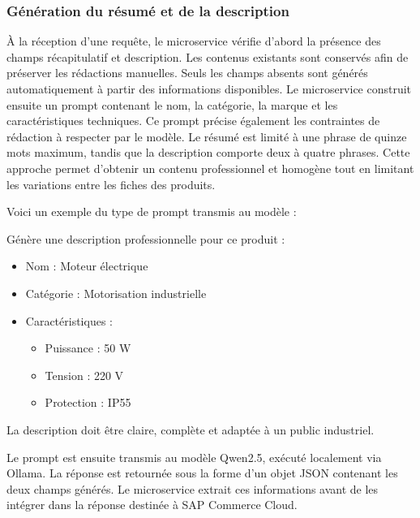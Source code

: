 \subsubsection{Génération du résumé et de la description}

À la réception d'une requête, le microservice vérifie d'abord la présence des champs récapitulatif et description. Les contenus existants sont conservés afin de préserver les rédactions manuelles. Seuls les champs absents sont générés automatiquement à partir des informations disponibles. Le microservice construit ensuite un prompt contenant le nom, la catégorie, la marque et les caractéristiques techniques. 
\newpage
Ce prompt précise également les contraintes de rédaction à respecter par le modèle. Le résumé est limité à une phrase de quinze mots maximum, tandis que la description comporte deux à quatre phrases. Cette approche permet d'obtenir un contenu professionnel et homogène tout en limitant les variations entre les fiches des produits.

Voici un exemple du type de prompt transmis au modèle :

\begin{tcolorbox}[
    colback=gray!5,
    colframe=black,
    title=Exemple de prompt envoyé au modèle,
    fonttitle=\bfseries
]
Génère une description professionnelle pour ce produit :

\begin{itemize}
    \item Nom : Moteur électrique
    \item Catégorie : Motorisation industrielle
    \item Caractéristiques :
    \begin{itemize}
        \item Puissance : 50 W
        \item Tension : 220 V
        \item Protection : IP55
    \end{itemize}
\end{itemize}

La description doit être claire, complète et adaptée à un public industriel.
\end{tcolorbox}


Le prompt est ensuite transmis au modèle Qwen2.5, exécuté localement via Ollama. La réponse est retournée sous la forme d'un objet JSON contenant les deux champs générés. Le microservice extrait ces informations avant de les intégrer dans la réponse destinée à SAP Commerce Cloud.

